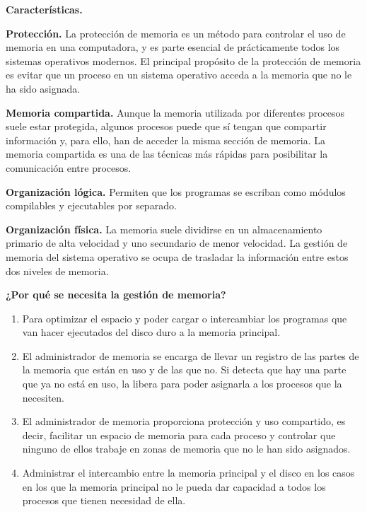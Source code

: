 \documentclass{article}
\begin{document}
\textbf{Características.}

\textbf{Protección.}
La protección de memoria es un método para controlar el uso de memoria en una computadora, y es parte esencial de prácticamente todos los sistemas operativos modernos. El principal propósito de la protección de memoria es evitar que un proceso en un sistema operativo acceda a la memoria que no le ha sido asignada.

\textbf{Memoria compartida.}
Aunque la memoria utilizada por diferentes procesos suele estar protegida, algunos procesos puede que sí tengan que compartir información y, para ello, han de acceder la misma sección de memoria. La memoria compartida es una de las técnicas más rápidas para posibilitar la comunicación entre procesos.

\textbf{Organización lógica.}
Permiten que los programas se escriban como módulos compilables y ejecutables por separado.

\textbf{Organización física.}
La memoria suele dividirse en un almacenamiento primario de alta velocidad y uno secundario de menor velocidad.  La gestión de memoria del sistema operativo se ocupa de trasladar la información entre estos dos niveles de memoria.

\textbf {¿Por qué se necesita la gestión de memoria?}

\begin{enumerate}
    \item Para optimizar el espacio y poder cargar o intercambiar los programas que van hacer ejecutados del disco duro a la memoria principal.
    \item El administrador de memoria se encarga de llevar un registro de las partes de la memoria que están en uso y de las que no. Si detecta que hay una parte que ya no está en uso, la libera para poder asignarla a los procesos que la necesiten.
    \item  El administrador de memoria proporciona  protección y uso compartido, es decir, facilitar un espacio de memoria para cada proceso y controlar que ninguno de ellos trabaje en zonas de memoria que no le han sido asignados.
     \item Administrar el intercambio entre la memoria principal y el disco en los casos en los que la memoria principal no le pueda dar capacidad a todos los procesos que tienen necesidad de ella.
\cite{UM}
\end{enumerate}
\end{document}
